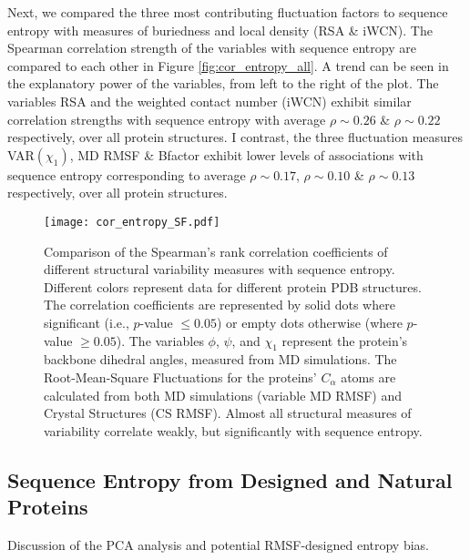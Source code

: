 \documentclass[preprint,12pt]{article}
\begin{document}
            Next, we compared the three most contributing fluctuation factors to sequence entropy with measures of buriedness and local density (RSA \& iWCN). The Spearman correlation strength of the variables with sequence entropy are compared to each other in Figure \ref{fig:cor_entropy_all}. A trend can be seen in the explanatory power of the variables, from left to the right of the plot. The variables RSA and the weighted contact number (iWCN) exhibit similar correlation strengths with sequence entropy with average $\rho\sim0.26$ \& $\rho\sim0.22$ respectively, over all protein structures. I contrast, the three fluctuation measures VAR$(\chi_1)$, MD RMSF \& Bfactor exhibit lower levels of associations with sequence entropy corresponding to average $\rho\sim0.17$, $\rho\sim0.10$ \& $\rho\sim0.13$ respectively, over all protein structures.


            \begin{figure*}[t]
            \begin{center}
                \texttt{[image: cor\_entropy\_SF.pdf]}
            \end{center}
            \caption{
                     Comparison of the Spearman's rank correlation coefficients of different structural variability measures with sequence entropy. Different colors represent data for different protein PDB structures. The correlation coefficients are represented by solid dots where significant (i.e., $p$-value $\leq0.05$) or empty dots otherwise (where $p$-value $\geq0.05$). The variables $\phi$, $\psi$, and $\chi_1$ represent the protein's backbone dihedral angles, measured from MD simulations. The Root-Mean-Square Fluctuations for the proteins' $C_\alpha$ atoms are calculated from both MD simulations (variable MD RMSF) and Crystal Structures (CS RMSF). Almost all structural measures of variability correlate weakly, but significantly with sequence entropy.
                     }
            \label{fig:cor_entropy_SF}
            \end{figure*}
	
    	\subsection{Sequence Entropy from Designed and Natural Proteins}
        \label{sec:SDN}
            
            Discussion of the PCA analysis and potential RMSF-designed entropy bias.
        
\end{document}

